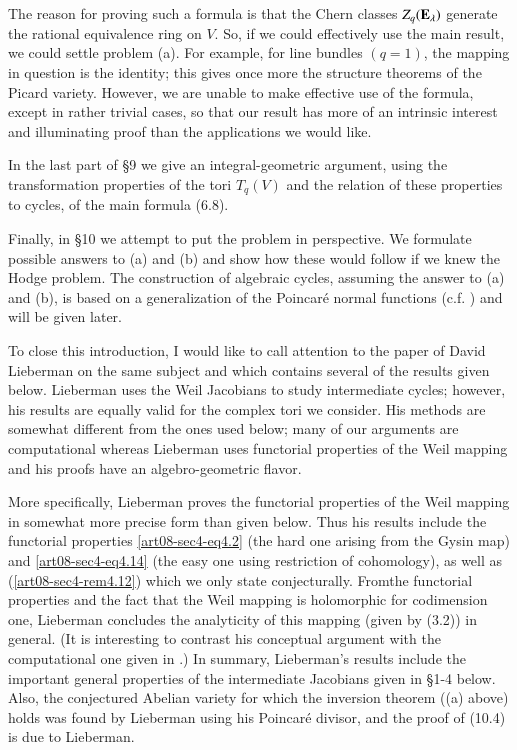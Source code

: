 The reason for proving such a formula is that the Chern classes $Z_{q}(\mathbf{E}_{\lambda})$ generate the rational equivalence ring on $V$. So, if we could effectively use the main result, we could settle problem (a). For example, for line bundles $(q=1)$, the mapping in question is the identity; this gives once more the structure theorems of the Picard variety. However, we are unable to make effective use of the formula, except in rather trivial cases, so that our result has more of an intrinsic interest and illuminating proof than the applications we would like.

In the last part of \S9 we give an integral-geometric argument, using the transformation properties of the tori $T_{q}(V)$ and the relation of these properties to cycles, of the main formula (6.8).

Finally, in \S10 we attempt to put the problem in perspective. We formulate possible answers to (a) and (b) and show how these would follow if we knew the Hodge problem. The construction of algebraic cycles, assuming the answer to (a) and (b), is based on a generalization of the Poincar\'e normal functions (c.f. \cite{art08-key19}) and will be given later.

To close this introduction, I would like to call attention to the paper of David Lieberman \cite{art08-key20} on the same subject and which contains several of the results given below. Lieberman uses the Weil Jacobians \cite{art08-key22} to study intermediate cycles; however, his results are equally valid for the complex tori we consider. His methods are somewhat different from the ones used below; many of our arguments are computational whereas Lieberman uses functorial properties of the Weil mapping and his proofs have an algebro-geometric flavor.

More specifically, Lieberman proves the functorial properties of the Weil mapping in somewhat more precise form than given below. Thus his results include the functorial properties \eqref{art08-sec4-eq4.2} (the hard one arising from the Gysin map) and \eqref{art08-sec4-eq4.14} (the easy one using restriction of cohomology), as well as (\ref{art08-sec4-rem4.12}) which we only state conjecturally. From\pageoriginale the functorial properties and the fact that the Weil mapping is holomorphic for codimension one, Lieberman concludes the analyticity of this mapping (given by (3.2)) in general. (It is interesting to contrast his conceptual argument with the computational one given in \cite{art08-key9}.) In summary, Lieberman's results include the important general properties of the intermediate Jacobians given in \S1-4 below. Also, the conjectured Abelian variety for which the inversion theorem ((a) above) holds was found by Lieberman using his Poincar\'e divisor, and the proof of (10.4) is due to Lieberman.

